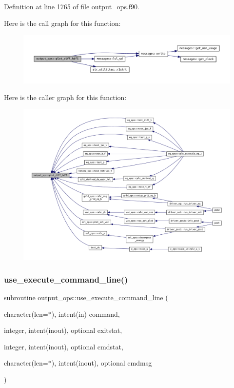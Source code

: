 Definition at line 1765 of file output\+\_\+ops.\+f90.

Here is the call graph for this function\+:\nopagebreak
\begin{figure}[H]
\begin{center}
\leavevmode
\includegraphics[width=350pt]{namespaceoutput__ops_ab0d14194d01ab0534562eab50b37a57a_cgraph}
\end{center}
\end{figure}
Here is the caller graph for this function\+:\nopagebreak
\begin{figure}[H]
\begin{center}
\leavevmode
\includegraphics[width=350pt]{namespaceoutput__ops_ab0d14194d01ab0534562eab50b37a57a_icgraph}
\end{center}
\end{figure}
\mbox{\label{namespaceoutput__ops_aa9e4855511b6ea16a08b3efb587bec51}} 
\subsubsection{\texorpdfstring{use\+\_\+execute\+\_\+command\+\_\+line()}{use\_execute\_command\_line()}}
{\footnotesize\ttfamily subroutine output\+\_\+ops\+::use\+\_\+execute\+\_\+command\+\_\+line (\begin{DoxyParamCaption}\item[{character(len=$\ast$), intent(in)}]{command,  }\item[{integer, intent(inout), optional}]{exitstat,  }\item[{integer, intent(inout), optional}]{cmdstat,  }\item[{character(len=$\ast$), intent(inout), optional}]{cmdmsg }\end{DoxyParamCaption})}



